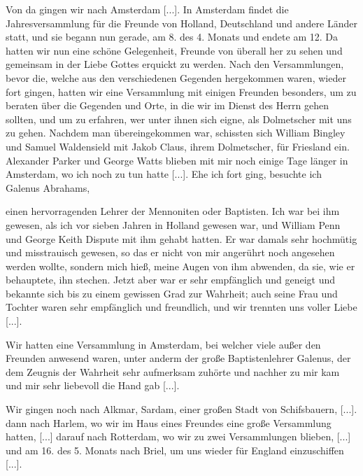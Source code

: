 Von da gingen wir nach Amsterdam [...]. In Amsterdam
findet die Jahresversammlung für die Freunde von Holland,
Deutschland und andere Länder statt, und sie begann nun gerade,
am 8. des 4. Monats und endete am 12. Da hatten wir nun
eine schöne Gelegenheit, Freunde von überall her zu sehen und
gemeinsam in der Liebe Gottes erquickt zu werden. Nach den
Versammlungen, bevor die, welche aus den verschiedenen Gegenden
hergekommen waren, wieder fort gingen, hatten wir eine 
Versammlung mit einigen Freunden besonders, um zu beraten über
die Gegenden und Orte, in die wir im Dienst des Herrn gehen
sollten, und um zu erfahren, wer unter ihnen sich eigne, als 
Dolmetscher mit uns zu gehen. Nachdem man übereingekommen war,
schissten sich William Bingley und Samuel 
Waldensield mit Jakob
Claus, ihrem Dolmetscher, für Friesland ein.
Alexander Parker und George Watts blieben mit mir
noch einige Tage länger in Amsterdam, wo ich noch zu tun
hatte [...]. Ehe ich fort ging, besuchte ich Galenus 
Abrahams,

einen hervorragenden Lehrer der 
Mennoniten oder Baptisten.
Ich war bei ihm gewesen, als ich vor sieben Jahren in Holland
gewesen war, und William Penn 
und George Keith Dispute
mit ihm gehabt hatten. Er war damals sehr hochmütig und
misstrauisch gewesen, so das er nicht von mir angerührt noch
angesehen werden wollte, sondern mich hieß, meine Augen von
ihm abwenden, da sie, wie er behauptete, ihn stechen. Jetzt aber
war er sehr empfänglich und geneigt und bekannte sich bis zu
einem gewissen Grad zur Wahrheit; auch seine Frau und Tochter
waren sehr empfänglich und freundlich, und wir trennten uns
voller Liebe [...].

Wir hatten eine Versammlung in Amsterdam, bei welcher
viele außer den Freunden anwesend waren, unter anderm der
große Baptistenlehrer Galenus, der dem Zeugnis der Wahrheit
sehr aufmerksam zuhörte und nachher zu mir kam und mir sehr
liebevoll die Hand gab [...].

Wir gingen noch nach Alkmar, Sardam, einer großen Stadt
von Schifsbauern, [...]. dann nach Harlem, wo wir im Haus
eines Freundes eine große Versammlung hatten, [...] darauf nach
Rotterdam, wo wir zu zwei Versammlungen blieben, [...] und
am 16. des 5. Monats nach Briel, um uns wieder für England
einzuschiffen [...].

